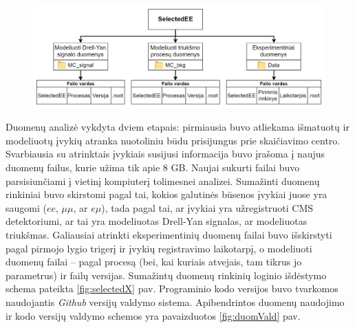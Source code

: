 \documentclass[a4paper, 12pt, twoside]{article}
\newcommand{\emu}{e\mu}
\begin{document}
\begin{figure}[H]
	\includegraphics[width=\textwidth]{atrinktu_duomenu_schema_v1.png}
\end{figure}

Duomenų analizė vykdyta dviem etapais: pirmiausia buvo atliekama išmatuotų ir modeliuotų įvykių atranka nuotoliniu
būdu prisijungus prie skaičiavimo centro.
Svarbiausia su atrinktais įvykiais susijusi informacija buvo įrašoma į naujus duomenų failus, kurie užima tik
apie $8$ GB.
Naujai sukurti failai buvo parsisiunčiami į vietinį kompiuterį tolimesnei analizei.
Sumažinti duomenų rinkiniai buvo skirstomi pagal tai, kokios galutinės būsenos įvykiai juose yra saugomi
($ee$, $\mu\mu$, ar $\emu$), tada pagal tai, ar įvykiai yra užregistruoti CMS detektoriumi, ar tai yra modeliuotas
Drell-Yan signalas, ar modeliuotas triukšmas.
Galiausiai atrinkti eksperimentinių duomenų failai buvo išskirstyti pagal pirmojo lygio trigerį ir įvykių
registravimo laikotarpį, o modeliuoti duomenų failai -- pagal procesą (bei, kai kuriais atvejais, tam tikrus
jo parametrus) ir failų versijas.
Sumažintų duomenų rinkinių loginio išdėstymo schema pateikta \ref{fig:selectedX} pav.
Programinio kodo versijos buvo tvarkomos naudojantis \textit{Github} versijų valdymo sistema.
Apibendrintos duomenų naudojimo ir kodo versijų valdymo schemos yra pavaizduotos \ref{fig:duomVald} pav.
\end{document}
